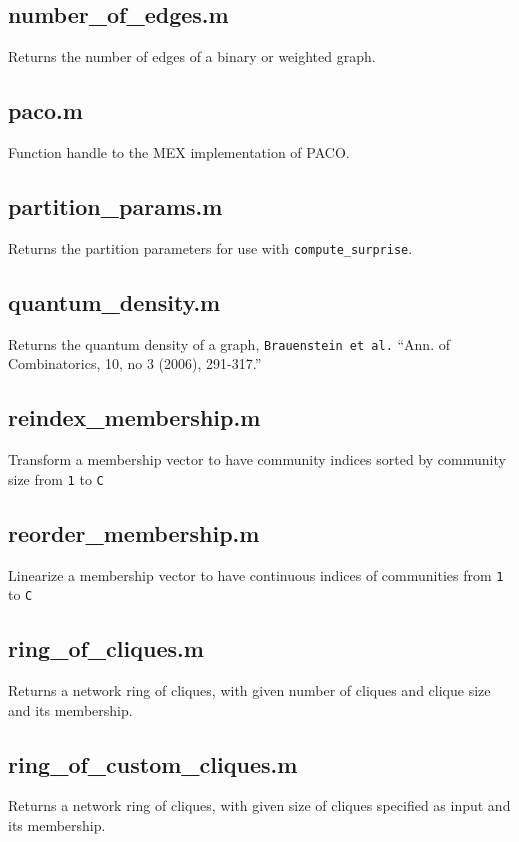 \begin{itemize}[<+->]
  \subsection*{number\_of\_edges.m} Returns the number of edges of a binary
  or weighted graph.

  \subsection*{paco.m} Function handle to the MEX implementation of PACO.

  \subsection*{partition\_params.m} Returns the partition parameters for use
  with \texttt{compute\_surprise}.

  \subsection*{quantum\_density.m} Returns the quantum density of a graph,
  \texttt{Brauenstein\ et\ al.} ``Ann. of Combinatorics, 10, no 3
  (2006), 291-317.''

  \subsection*{reindex\_membership.m} Transform a membership vector to have
  community indices sorted by community size from \texttt{1} to
  \texttt{\textbar{}C\textbar{}}

  \subsection*{reorder\_membership.m} Linearize a membership vector to have
  continuous indices of communities from \texttt{1} to
  \texttt{\textbar{}C\textbar{}}

  \subsection*{ring\_of\_cliques.m} Returns a network ring of cliques, with
  given number of cliques and clique size and its membership.

  \subsection*{ring\_of\_custom\_cliques.m} Returns a network ring of
  cliques, with given size of cliques specified as input and its
  membership.


\end{itemize}
